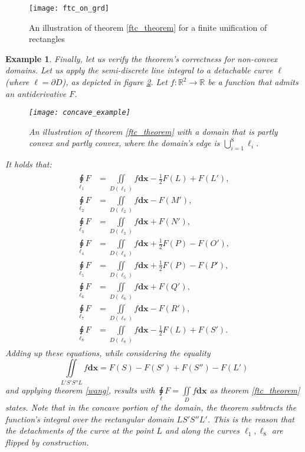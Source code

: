\documentclass[11pt]{book}
\newtheorem{exm}[thm]{Example}
\begin{document}
\begin{figure}
\texttt{[image: ftc\_on\_grd]}
\caption{An illustration of theorem \ref{ftc_theorem} for a finite unification of rectangles}
\label{ftc_on_grd}
\end{figure}

\begin{exm}Finally, let us verify the theorem's correctness for non-convex domains. Let us apply the semi-discrete line integral to a detachable
curve $\ell$ (where $\ell=\partial D$), as depicted in figure
\ref{concave_example}. Let $f:\mathbb{R}^{2}\rightarrow\mathbb{R}$ be a function that
admits an antiderivative $F$.

\begin{figure}
\texttt{[image: concave\_example]}
\caption{An illustration of theorem \ref{ftc_theorem} with a domain that is partly convex and partly convex, where the domain’s edge is $\bigcup_{i=1}^{8}\ell_{i}$.}
\label{concave_example}
\end{figure}

It holds that:
\begin{align}
\begin{aligned}
\underset{\ell_{1}}{\sqint}F & =\underset{D\left(\ell_{1}\right)}{\iint}f\boldsymbol{dx}-\frac{1}{2}F\left(L\right)+F\left(L'\right),\\
\underset{\ell_{2}}{\sqint}F & =\underset{D\left(\ell_{2}\right)}{\iint}f\boldsymbol{dx}-F\left(M'\right),\\
\underset{\ell_{3}}{\sqint}F & =\underset{D\left(\ell_{3}\right)}{\iint}f\boldsymbol{dx}+F\left(N'\right),\\
\underset{\ell_{4}}{\sqint}F & =\underset{D\left(\ell_{4}\right)}{\iint}f\boldsymbol{dx}+\frac{1}{2}F\left(P\right)-F\left(O'\right),\\
\underset{\ell_{5}}{\sqint}F & =\underset{D\left(\ell_{5}\right)}{\iint}f\boldsymbol{dx}+\frac{1}{2}F\left(P\right)-F\left(P'\right),\\
\underset{\ell_{6}}{\sqint}F & =\underset{D\left(\ell_{6}\right)}{\iint}f\boldsymbol{dx}+F\left(Q'\right),\\
\underset{\ell_{7}}{\sqint}F & =\underset{D\left(\ell_{7}\right)}{\iint}f\boldsymbol{dx}-F\left(R'\right),\\
\underset{\ell_{8}}{\sqint}F & =\underset{D\left(\ell_{8}\right)}{\iint}f\boldsymbol{dx}-\frac{1}{2}F\left(L\right)+F\left(S'\right).
\end{aligned}
\end{align}
Adding up these equations, while considering the equality
\[
\underset{L'S'S''L}{\iint}f\boldsymbol{dx}=F\left(S\right)-F\left(S'\right)+F\left(S''\right)-F\left(L'\right)
\]
and applying theorem \ref{wang}, results with $\underset{\ell}{\sqint}F=\underset{D}{\iint}f\boldsymbol{dx}$
as theorem \ref{ftc_theorem} states. Note that in the concave portion of the domain, the theorem subtracts the function's integral over the rectangular domain $LS'S''L'$. This is the reason that the detachments of the curve at the point $L$ and along the curves $\ell_1,\ell_8$ are flipped by construction.
\end{exm}
\end{document}
